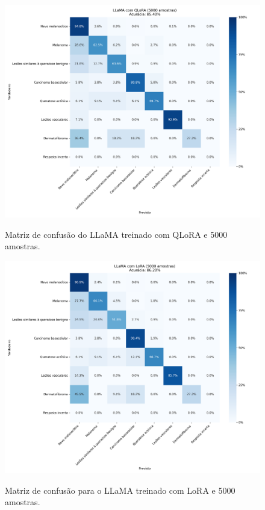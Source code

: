 \begin{figure}[ht]
    \centering
    \caption{\small Matriz de confusão do \ac{LLaMA} treinado com \ac{QLoRA} e 5000 amostras.}
    \includegraphics[width=1\columnwidth,keepaspectratio]{images/confusion_matrix_qlora_5000.png}
    \label{fig:confusion_matrix_qlora_5000}
\end{figure}

\clearpage

\begin{figure}[ht]
    \centering
    \caption{\small Matriz de confusão para o \ac{LLaMA} treinado com \ac{LoRA} e 5000 amostras.}
    \includegraphics[width=1\columnwidth,keepaspectratio]{images/confusion_matrix_lora_5000.png}
    \label{fig:confusion_matrix_lora_5000}
\end{figure}

